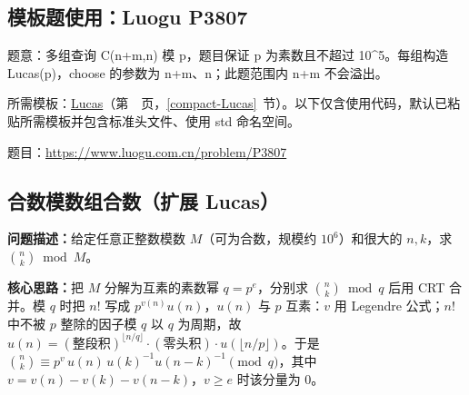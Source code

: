 

\Needspace{270pt}



\Needspace{344pt}

\subsection*{模板题使用：Luogu P3807}

\label{usage-example-40}

题意：多组查询 C(n+m,n) 模 p，题目保证 p 为素数且不超过 10\textasciicircum{}5。每组构造 Lucas(p)，choose 的参数为 n+m、n；此题范围内 n+m 不会溢出。

所需模板：\hyperref[compact-Lucas]{Lucas}（第~\pageref{compact-Lucas}~页，\ref{compact-Lucas}~节）。以下仅含使用代码，默认已粘贴所需模板并包含标准头文件、使用 std 命名空间。

题目：\url{https://www.luogu.com.cn/problem/P3807}



\subsection{合数模数组合数（扩展 Lucas）}\label{compact-ExLucas}

\noindent\textbf{问题描述：}\allowbreak 给定任意正整数模数 $M$（可为合数，规模约 $10^6$）和很大的 $n,k$，求 $\binom nk\bmod M$。

\textbf{核心思路：}\allowbreak 把 $M$ 分解为互素的素数幂 $q=p^e$，分别求 $\binom nk\bmod q$ 后用 CRT 合并。模 $q$ 时把 $n!$ 写成 $p^{v(n)}u(n)$，$u(n)$ 与 $p$ 互素：$v$ 用 Legendre 公式；$n!$ 中不被 $p$ 整除的因子模 $q$ 以 $q$ 为周期，故 $u(n)=(\text{整段积})^{\lfloor n/q\rfloor}\cdot(\text{零头积})\cdot u(\lfloor n/p\rfloor)$。于是 $\binom nk\equiv p^{v}\,u(n)\,u(k)^{-1}u(n-k)^{-1}\pmod q$，其中 $v=v(n)-v(k)-v(n-k)$，$v\ge e$ 时该分量为 0。

